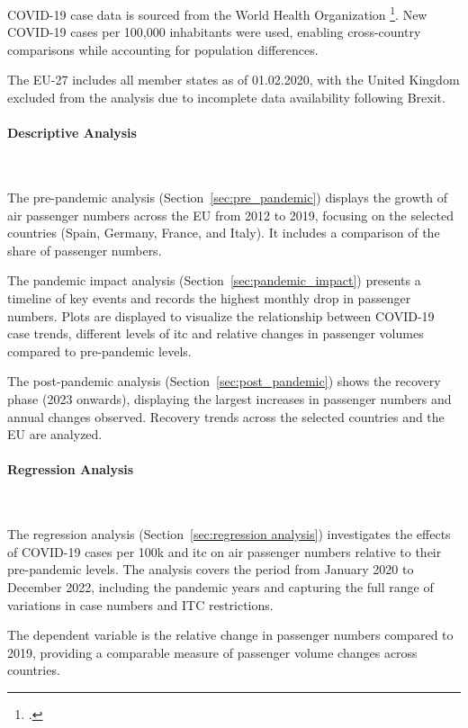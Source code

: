 \documentclass[12pt,onehalfspacing,headsepline,oneside,openright,a4paper, fleqn]{report}
\begin{document}
COVID-19 case data is sourced from the World Health Organization \footcite{who}. New COVID-19 cases per 100,000 inhabitants were used, enabling cross-country comparisons while accounting for population differences.

The EU-27 includes all member states as of 01.02.2020, with the United Kingdom excluded from the analysis due to incomplete data availability following Brexit.

\paragraph{Descriptive Analysis}
\

The pre-pandemic analysis (Section~\ref{sec:pre_pandemic}) displays the growth of air passenger numbers across the EU from 2012 to 2019, focusing on the selected countries (Spain, Germany, France, and Italy). It includes a comparison of the share of passenger numbers.

The pandemic impact analysis (Section~\ref{sec:pandemic_impact}) presents a timeline of key events and records the highest monthly drop in passenger numbers. Plots are displayed to visualize the relationship between COVID-19 case trends, different levels of \gls{itc} and relative changes in passenger volumes compared to pre-pandemic levels.

The post-pandemic analysis (Section~\ref{sec:post_pandemic}) shows the recovery phase (2023 onwards), displaying the largest increases in passenger numbers and annual changes observed. Recovery trends across the selected countries and the EU are analyzed.

\paragraph{Regression Analysis}
\

The regression analysis (Section~\ref{sec:regression analysis}) investigates the effects of COVID-19 cases per 100k and \gls{itc} on air passenger numbers relative to their pre-pandemic levels. The analysis covers the period from January 2020 to December 2022, including the pandemic years and capturing the full range of variations in case numbers and ITC restrictions. 

The dependent variable is the relative change in passenger numbers compared to 2019, providing a comparable measure of passenger volume changes across countries. 
\end{document}
